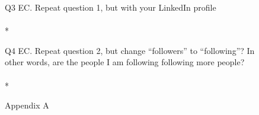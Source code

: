 \documentclass{article}
\begin{document}
Q3 EC. Repeat question 1, but with your LinkedIn profile\\
\\*

Q4 EC. Repeat question 2, but change ``followers'' to ``following''?  In\\
other words, are the people I am following following more people?\\
\\*

\newpage
\appendix
Appendix A

\end{document}

